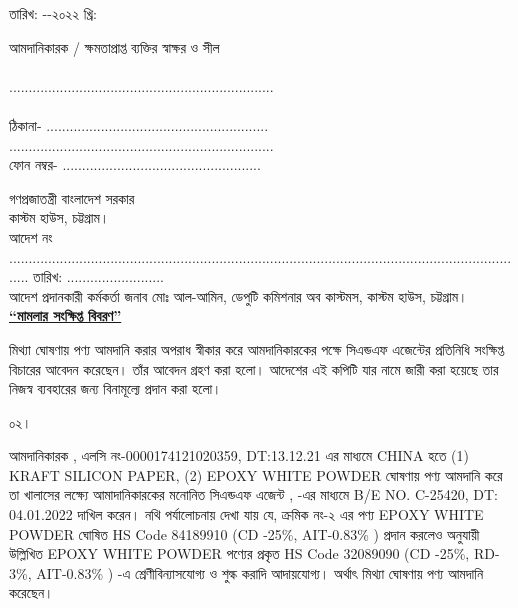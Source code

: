 \documentclass[12pt]{article}
\newcommand{\co}{CHINA}
\newcommand{\beno}{C-25420}
\newcommand{\bedt}{04.01.2022}
\newcommand{\lcno}{0000174121020359}
\newcommand{\lcdt}{13.12.21}
\newcommand{\impn}{\jeal}
\newcommand{\impadd}{\jeala}
\newcommand{\rodt}{\hspace{3em}-\hspace{3em}-২০২২ খ্রি:}
\begin{document}
\begin{minipage}[t]{0.55\linewidth}
তারিখ: {\rodt}
\end{minipage}
\begin{minipage}[t]{0.45\linewidth}
আমদানিকারক / ক্ষমতাপ্রাপ্ত ব্যক্তির স্বাক্ষর ও সীল
\\
\\
....................................................................
\\
\\
ঠিকানা- .........................................................
\\
....................................................................
\\
ফোন নম্বর-  ...................................................
\end{minipage}
\thispagestyle{empty}
\newpage
{}
\fontsize{10pt}{10pt}\selectfont
\begin{center}
গণপ্রজাতন্ত্রী বাংলাদেশ সরকার
\\
কাস্টম হাউস, চট্টগ্রাম।
\\
আদেশ নং ...................................................................................................................................... তারিখ: .........................
\\
আদেশ প্রদানকারী কর্মকর্তা জনাব মোঃ আল-আমিন, ডেপুটি কমিশনার অব কাস্টমস, কাস্টম হাউস, চট্টগ্রাম।
\\
\textbf{\underline{``মামলার সংক্ষিপ্ত বিবরণ''}}
\\
\end{center}
\begin{minipage}[t]{0.05\linewidth}
\hspace{0em}
\end{minipage}
\begin{minipage}[t]{0.95\linewidth}
মিথ্যা ঘোষণায় পণ্য আমদানি করার অপরাধ স্বীকার করে আমদানিকারকের পক্ষে
সিএন্ডএফ এজেন্টের প্রতিনিধি সংক্ষিপ্ত বিচারের আবেদন করেছেন।
তাঁর আবেদন গ্রহণ করা হলো। আদেশের এই কপিটি যার নামে জারী করা হয়েছে
তার নিজস্ব ব্যবহারের জন্য বিনামূল্যে প্রদান করা হলো।
\\
\end{minipage}
\begin{minipage}[t]{0.05\linewidth}
০২।
\end{minipage}
\begin{minipage}[t]{0.95\linewidth}
আমদানিকারক {\impn}, {\impadd}
এলসি নং-{\lcno}, DT:{\lcdt}
এর মাধ্যমে {\co}
হতে
(1) KRAFT SILICON PAPER,
(2) EPOXY WHITE POWDER
ঘোষণায় পণ্য আমদানি করে তা
খালাসের লক্ষ্যে আমাদানিকারকের
মনোনিত সিএন্ডএফ এজেন্ট
{\cnfn}, {\cnfadd} -এর
মাধ্যমে
B/E NO. {\beno}, DT: {\bedt}
দাখিল করেন।
নথি পর্যালোচনায় দেখা যায় যে,
ক্রমিক নং-২ এর পণ্য
EPOXY WHITE POWDER
ঘোষিত HS Code 84189910
(CD -25\%, AIT-0.83\% )
প্রদান করলেও
{\fsen}
অনুযায়ী উল্লিখিত
EPOXY WHITE POWDER
পণ্যের প্রকৃত HS Code 32089090
(CD -25\%, RD-3\%, AIT-0.83\% ) -এ
শ্রেণীবিন্যাসযোগ্য ও শুল্ক করাদি আদায়যোগ্য।
অর্থাৎ মিথ্যা ঘোষণায় পণ্য আমদানি করেছেন।
\end{minipage}
\end{document}
